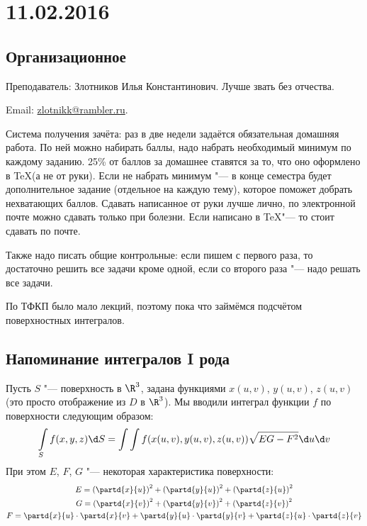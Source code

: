 
\chapter{11.02.2016}

\section{Организационное}
Преподаватель: Злотников Илья Константинович.
Лучше звать без отчества.

Email: \href{mailto:zlotnikk@rambler.ru}{zlotnikk@rambler.ru}.

Система получения зачёта: раз в две недели задаётся обязательная домашняя работа.
По ней можно набирать баллы, надо набрать необходимый минимум по каждому заданию.
25\% от баллов за домашнее ставятся за то, что оно оформлено в \TeX (а не от руки).
Если не набрать минимум "--- в конце семестра будет дополнительное задание (отдельное на каждую тему),
которое поможет добрать нехватающих баллов.
Сдавать написанное от руки лучше лично, по электронной почте можно сдавать только при болезни.
Если написано в \TeX "--- то стоит сдавать по почте.

Также надо писать общие контрольные: если пишем с первого раза, то достаточно решить все задачи кроме одной,
если со второго раза "--- надо решать все задачи.

По ТФКП было мало лекций, поэтому пока что займёмся подсчётом поверхностных интегралов.

\section{Напоминание интегралов I рода}
Пусть $S$ "--- поверхность в $\R^3$, задана функциями $x(u, v)$, $y(u, v)$, $z(u, v)$
(это просто отображение из $D$ в $\R^3$).
Мы вводили интеграл функции $f$ по поверхности следующим образом:
\begin{equation}\label{int_surf_I}
	\int\limits_{S} f(x, y, z) \d S =
	\int\int f(x(u, v), y(u, v), z(u, v)) \sqrt{EG-F^2} \d u \d v
\end{equation}
При этом $E$, $F$, $G$ "--- некоторая характеристика поверхности:
\begin{gather*}
	E=\left(\partd{x}{u}\right)^2 + \left(\partd{y}{u}\right)^2 + \left(\partd{z}{u}\right)^2 \\
	G=\left(\partd{x}{v}\right)^2 + \left(\partd{y}{v}\right)^2 + \left(\partd{z}{v}\right)^2 \\
	F=\partd{x}{u} \cdot \partd{x}{v} + \partd{y}{u} \cdot \partd{y}{v} + \partd{z}{u} \cdot \partd{z}{v}
\end{gather*}

